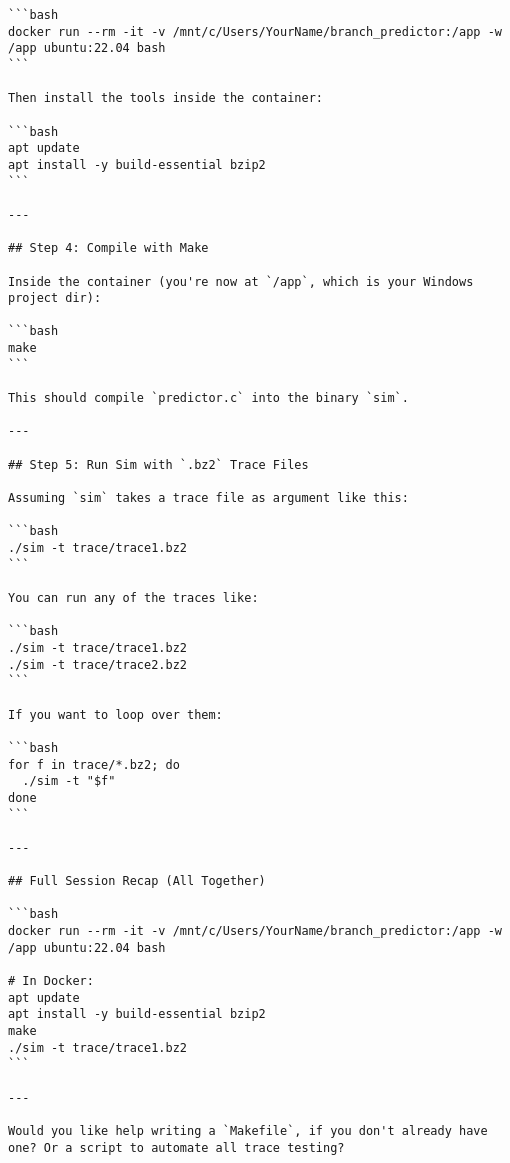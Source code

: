 \documentclass[sigconf, screen]{acmart}
\begin{document}
\begin{Verbatim}[fontsize=\tiny, breaklines=true]
```bash
docker run --rm -it -v /mnt/c/Users/YourName/branch_predictor:/app -w /app ubuntu:22.04 bash
```

Then install the tools inside the container:

```bash
apt update
apt install -y build-essential bzip2
```

---

## Step 4: Compile with Make

Inside the container (you're now at `/app`, which is your Windows project dir):

```bash
make
```

This should compile `predictor.c` into the binary `sim`.

---

## Step 5: Run Sim with `.bz2` Trace Files

Assuming `sim` takes a trace file as argument like this:

```bash
./sim -t trace/trace1.bz2
```

You can run any of the traces like:

```bash
./sim -t trace/trace1.bz2
./sim -t trace/trace2.bz2
```

If you want to loop over them:

```bash
for f in trace/*.bz2; do
  ./sim -t "$f"
done
```

---

## Full Session Recap (All Together)

```bash
docker run --rm -it -v /mnt/c/Users/YourName/branch_predictor:/app -w /app ubuntu:22.04 bash

# In Docker:
apt update
apt install -y build-essential bzip2
make
./sim -t trace/trace1.bz2
```

---

Would you like help writing a `Makefile`, if you don't already have one? Or a script to automate all trace testing?
\end{Verbatim}
\end{document}
